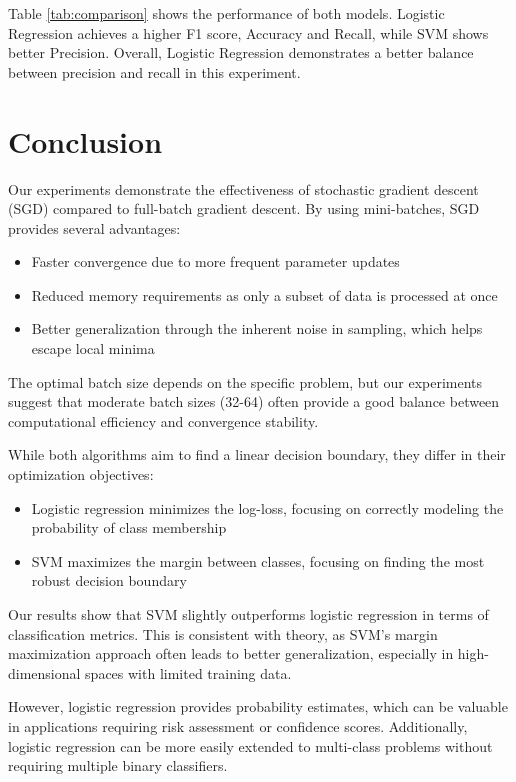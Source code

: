 \documentclass[journal, a4paper]{IEEEtran}
\begin{document}
Table \ref{tab:comparison} shows the performance of both models. Logistic Regression achieves a higher F1 score, Accuracy and Recall, while SVM shows better Precision. Overall, Logistic Regression demonstrates a better balance between precision and recall in this experiment.

\section{Conclusion}
Our experiments demonstrate the effectiveness of stochastic gradient descent (SGD) compared to full-batch gradient descent. By using mini-batches, SGD provides several advantages:

\begin{itemize}
    \item Faster convergence due to more frequent parameter updates
    \item Reduced memory requirements as only a subset of data is processed at once
    \item Better generalization through the inherent noise in sampling, which helps escape local minima
\end{itemize}

The optimal batch size depends on the specific problem, but our experiments suggest that moderate batch sizes (32-64) often provide a good balance between computational efficiency and convergence stability.

While both algorithms aim to find a linear decision boundary, they differ in their optimization objectives:

\begin{itemize}
    \item Logistic regression minimizes the log-loss, focusing on correctly modeling the probability of class membership
    \item SVM maximizes the margin between classes, focusing on finding the most robust decision boundary
\end{itemize}

Our results show that SVM slightly outperforms logistic regression in terms of classification metrics. This is consistent with theory, as SVM's margin maximization approach often leads to better generalization, especially in high-dimensional spaces with limited training data.

However, logistic regression provides probability estimates, which can be valuable in applications requiring risk assessment or confidence scores. Additionally, logistic regression can be more easily extended to multi-class problems without requiring multiple binary classifiers.
\end{document}
